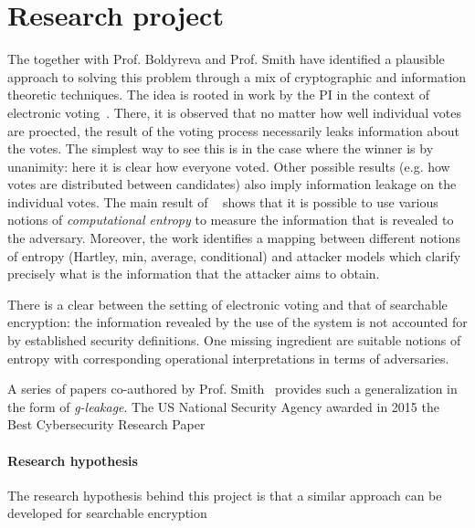 \newpage

\section{Research project}
\label{sec:prop_hyp}

The \PI together with Prof. Boldyreva and Prof. Smith have identified a plausible approach to solving this problem through a mix of cryptographic and information theoretic techniques. 
The idea is rooted in work by the PI in the context of electronic voting~\cite{bernhard2012measuring}. 
There, it is observed that no matter how well individual votes are proected, the result of the voting process necessarily leaks information about the votes.
The simplest way to see this is in the case where the winner is by unanimity: here it is clear how everyone voted. 
Other possible results (e.g. how votes are distributed between candidates) also imply information leakage on the individual votes. 
The main result of ~\cite{bernhard2012measuring} shows that it is possible to use various notions of \emph{computational entropy} to measure the information that is revealed to the adversary.  
Moreover, the work identifies a mapping between different notions of entropy (Hartley, min, average, conditional) and attacker models which clarify precisely what is the information that the attacker aims to obtain. 

There is a clear between the setting of electronic voting and that of searchable encryption:  the information revealed by the  use of the system is not accounted for by established security definitions.  One missing ingredient are suitable notions of entropy with corresponding operational interpretations in terms of adversaries. 

A series of papers co-authored by Prof. Smith~\cite{DBLP:conf/csfw/AlvimCPS12,DBLP:conf/csfw/AlvimCMMPS14,DBLP:conf/csfw/AlvimCMMPS16,DBLP:conf/csfw/SmithS17} provides such a generalization in the form of \emph{g-leakage}. 
The US National Security Agency awarded in 2015 the Best Cybersecurity Research Paper 



\paragraph{Research hypothesis}
The research hypothesis behind this project is that a similar approach can be developed for searchable encryption


